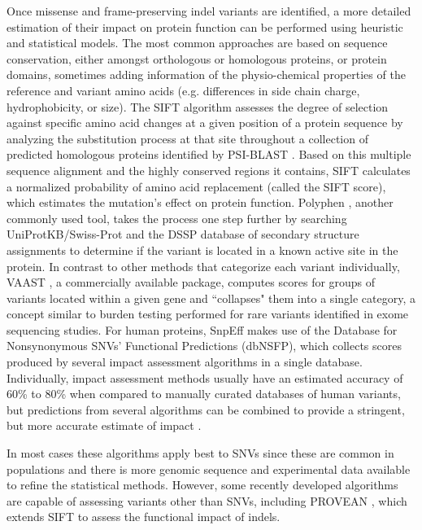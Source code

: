 Once missense and frame-preserving indel variants are identified, a more detailed estimation of their impact on protein function can be performed using heuristic and statistical models. The most common approaches are based on sequence conservation, either amongst orthologous or homologous proteins, or protein domains, sometimes adding information of the physio-chemical properties of the reference and variant amino acids (e.g. differences in side chain charge, hydrophobicity, or size). The SIFT algorithm \cite{kumar2009predicting} assesses the degree of selection against specific amino acid changes at a given position of a protein sequence by analyzing the substitution process at that site throughout a collection of predicted homologous proteins identified by PSI-BLAST \cite{altschul1997gapped}. Based on this multiple sequence alignment and the highly conserved regions it contains, SIFT calculates a normalized probability of amino acid replacement (called the SIFT score), which estimates the mutation's effect on protein function. Polyphen \cite{adzhubei2010method}, another commonly used tool, takes the process one step further by searching UniProtKB/Swiss-Prot \cite{uniprot2013update} and the DSSP database of secondary structure assignments \cite{joosten2011series} to determine if the variant is located in a known active site in the protein. In contrast to other methods that categorize each variant individually, VAAST \cite{rope2011using}, a commercially available package, computes scores for groups of variants located within a given gene and ``collapses" them into a single category, a concept similar to burden testing performed for rare variants identified in exome sequencing studies. For human proteins, SnpEff makes use of the Database for Nonsynonymous SNVs' Functional Predictions \cite{liu2011dbnsfp} (dbNSFP), which collects scores produced by several impact assessment algorithms in a single database. Individually, impact assessment methods usually have an estimated accuracy of 60\% to 80\% when compared to manually curated databases of human variants, but predictions from several algorithms can be combined to provide a stringent, but more accurate estimate of impact \cite{choi2012predicting}.

In most cases these algorithms apply best to SNVs since these are common in populations and there is more genomic sequence and experimental data available to refine the statistical methods. However, some recently developed algorithms are capable of assessing variants other than SNVs, including PROVEAN \cite{choi2012predicting}, which extends SIFT to assess the functional impact of indels.

